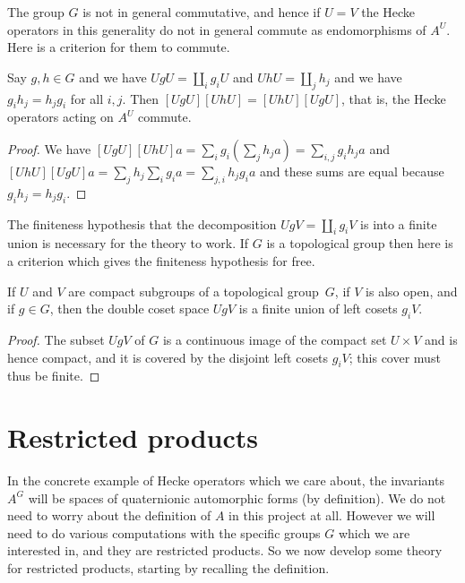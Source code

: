 The group $G$ is not in general commutative, and hence if $U=V$
the Hecke operators in this generality do not in general commute
as endomorphisms of $A^U$. Here is a criterion for
them to commute.

\begin{lemma}
  \label{AbstractHeckeOperator.comm}
  \leanok
  Say $g,h\in G$ and we have $UgU=\coprod_i g_iU$
  and $UhU=\coprod_j h_j$ and we have $g_ih_j=h_jg_i$ for all $i,j$.
  Then $[UgU][UhU]=[UhU][UgU]$, that is, the Hecke operators
  acting on $A^U$ commute.
\end{lemma}
\begin{proof}
  \leanok
  We have $[UgU][UhU]a=\sum_ig_i(\sum_jh_ja)=\sum_{i,j}g_ih_ja$
  and $[UhU][UgU]a=\sum_jh_j\sum_ig_ia=\sum_{j,i}h_jg_ia$ and these
  sums are equal because $g_ih_j=h_jg_i$.
\end{proof}

The finiteness hypothesis that the decomposition $UgV=\coprod_i g_iV$ is
into a finite union is necessary for the theory to work. If $G$ is a topological
group then here is a criterion which gives the finiteness hypothesis for free.

\begin{lemma}
  \label{QuotientGroup.mk_image_finite_of_compact_of_open}
  \leanok
  If $U$ and $V$ are compact subgroups of a topological group~$G$,
  if $V$ is also open, and if $g\in G$, then the double coset space $UgV$
  is a finite union of left cosets $g_iV$.
\end{lemma}
\begin{proof}
  \leanok
  The subset $UgV$ of $G$ is a continuous image of the compact set $U\times V$
  and is hence compact, and it is covered by the disjoint left cosets $g_iV$;
  this cover must thus be finite.
\end{proof}

\section{Restricted products}

In the concrete example of Hecke operators which we care about, the invariants $A^G$
will be spaces of quaternionic automorphic
forms (by definition). We do not need to worry about the definition of $A$ in this
project at all. However we will need to do various computations with the
specific groups $G$ which we are interested in, and they are restricted products.
So we now develop some theory for restricted products,
starting by recalling the definition.

